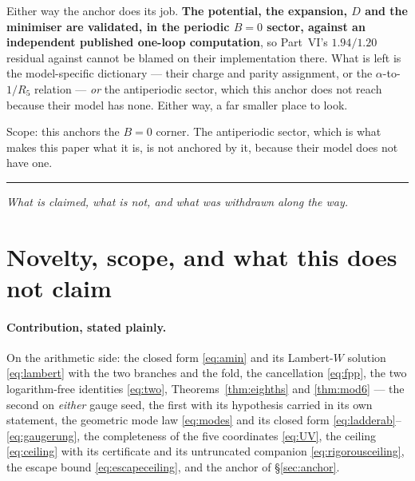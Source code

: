 \documentclass[11pt,a4paper]{article}
\newcommand{\bridge}[1]{\par\medskip\noindent
  \textcolor{hdrblue!45}{\rule{2.2cm}{0.6pt}}\;\;\parbox[t]{0.84\textwidth}{\small\itshape
  \textcolor{hdrblue!85}{#1}}\par\medskip}
\newenvironment{keyeq}
  {\begin{center}\setlength{\fboxsep}{9pt}\setlength{\fboxrule}{0.8pt}%
   \begin{lrbox}{\keyeqbox}\begin{minipage}{0.88\textwidth}}
  {\end{minipage}\end{lrbox}%
   \fcolorbox{hdrblue!55}{hdrblue!6}{\usebox{\keyeqbox}}\end{center}}
\begin{document}
\begin{keyeq}
Either way the anchor does its job. \textbf{The potential, the expansion, $D$ and the minimiser are
validated, in the periodic $B=0$ sector, against an independent published one-loop computation}, so
Part~VI's $1.94/1.20$ residual against \cite{KM25} cannot be blamed on their implementation there.
What is left is the model-specific dictionary --- their charge and parity assignment, or the
$\alpha$-to-$1/R_5$ relation --- \emph{or} the antiperiodic sector, which this anchor does not
reach because their model has none. Either way, a far smaller place to look.
\end{keyeq}

\noindent Scope: this anchors the $B=0$ corner. The antiperiodic sector, which is what makes
this paper what it is, is not anchored by it, because their model does not have one.

\bridge{What is claimed, what is not, and what was withdrawn along the way.}

\section{Novelty, scope, and what this does not claim}\label{sec:novel}

\paragraph{Contribution, stated plainly.} On the arithmetic side: the closed form \eqref{eq:amin}
and its Lambert-$W$ solution \eqref{eq:lambert} with the two branches and the fold, the
cancellation \eqref{eq:fpp}, the two logarithm-free identities \eqref{eq:two},
Theorems~\ref{thm:eighths} and \ref{thm:mod6} --- the second on \emph{either} gauge seed, the
first with its hypothesis carried in its own statement,
the geometric mode law \eqref{eq:modes} and its closed form
\eqref{eq:ladderab}--\eqref{eq:gaugerung}, the completeness of the five coordinates
\eqref{eq:UV}, the ceiling \eqref{eq:ceiling} with its certificate and its untruncated companion
\eqref{eq:rigorousceiling}, the escape bound \eqref{eq:escapeceiling}, and the anchor of
\S\ref{sec:anchor}.
\end{document}
